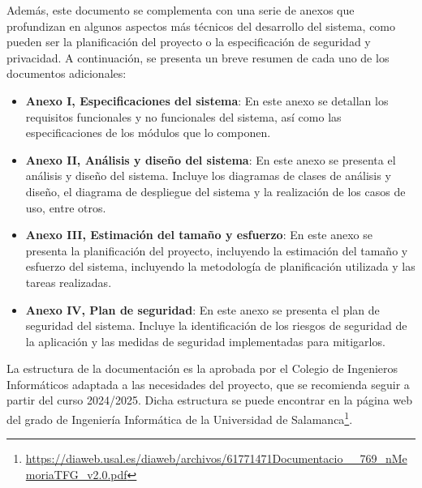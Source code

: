 Además, este documento se complementa con una serie de anexos que profundizan en algunos aspectos
más técnicos del desarrollo del sistema, como pueden ser la planificación del proyecto o la
especificación de seguridad y privacidad. A continuación, se presenta un breve resumen de
cada uno de los documentos adicionales:
\begin{itemize}
    \item \textbf{Anexo I, Especificaciones del sistema}: En este anexo se detallan los requisitos
        funcionales y no funcionales del sistema, así como las especificaciones de los módulos
        que lo componen.

    \item \textbf{Anexo II, Análisis y diseño del sistema}: En este anexo se presenta el análisis y
        diseño del sistema. Incluye los diagramas de clases de análisis y diseño, el diagrama de
        despliegue del sistema y la realización de los casos de uso, entre otros.

    \item \textbf{Anexo III, Estimación del tamaño y esfuerzo}: En este anexo se presenta la
        planificación del proyecto, incluyendo la estimación del tamaño y esfuerzo del sistema,
        incluyendo la metodología de planificación utilizada y las tareas realizadas.

    \item \textbf{Anexo IV, Plan de seguridad}: En este anexo se presenta el plan de seguridad del
        sistema. Incluye la identificación de los riesgos de seguridad de la aplicación y las
        medidas de seguridad implementadas para mitigarlos.
\end{itemize}

La estructura de la documentación es la aprobada por el Colegio de Ingenieros Informáticos adaptada
a las necesidades del proyecto, que se recomienda seguir a partir del curso 2024/2025. Dicha
estructura se puede encontrar en la página web del grado de Ingeniería Informática de la
Universidad de Salamanca\footnote{%
\url{https://diaweb.usal.es/diaweb/archivos/61771471Documentacio__769_nMemoriaTFG_v2.0.pdf}}.
